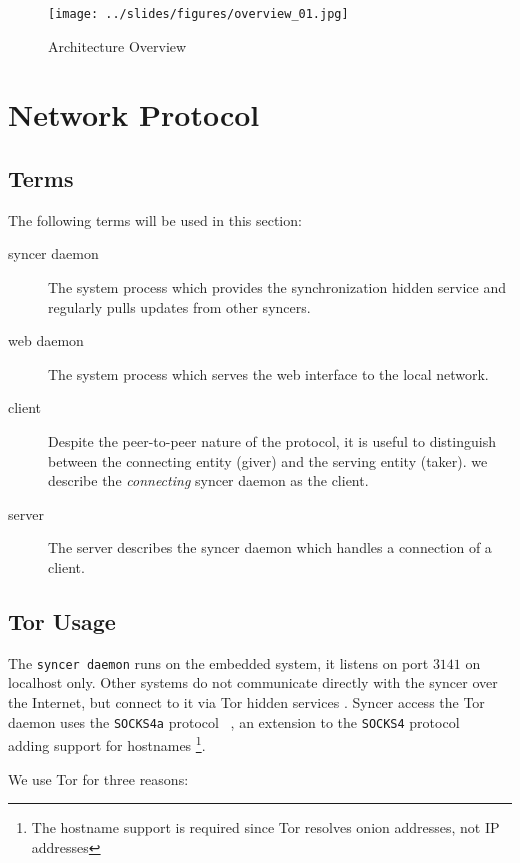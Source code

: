 \documentclass[12pt]{article}
\begin{document}
\begin{landscape}
\begin{figure}[h]
  \centering
    \texttt{[image: ../slides/figures/overview\_01.jpg]} 
  \caption{Architecture Overview} \label{arch_overview}
\end{figure}
\end{landscape}
  
\section{Network Protocol}
\label{syncer_protocol}
\subsection{Terms}

The following terms will be used in this section:

\begin{description}
\item[syncer daemon] The system process which provides the synchronization hidden service and regularly pulls updates from other syncers.
\item[web daemon] The system process which serves the web interface to the local network.
\item[client] Despite the peer-to-peer nature of the protocol, it is useful to distinguish between the connecting entity (giver) and the serving entity (taker). we describe the \textit{connecting} syncer daemon as the client.
\item[server] The server describes the syncer daemon which handles a connection of a client.
\end{description}

\subsection{Tor Usage}
\label{tor}
The \texttt{syncer daemon} runs on the embedded system, it listens on port $3141$ on localhost only.
Other systems do not communicate directly with the syncer over the Internet, but connect to it via Tor hidden services \cite{TorHiddenServices}. Syncer access the Tor daemon uses the \texttt{SOCKS4a} protocol ~\cite{socks4a}, an extension to the \texttt{SOCKS4} protocol ~\cite{socks4} adding support for hostnames \footnote{The hostname support is required since Tor resolves onion addresses, not IP addresses}.

We use Tor for three reasons:
\end{document}

